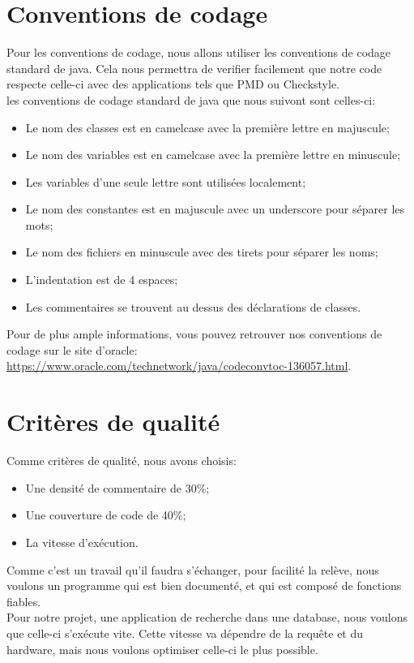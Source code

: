 \documentclass[a4paper,11pt]{article}
\begin{document}
\section{Conventions de codage}
Pour les conventions de codage, nous allons utiliser les conventions de codage standard de java.
Cela nous permettra de verifier facilement que notre code respecte celle-ci avec des applications tels que PMD ou Checkstyle.\\
les conventions de codage standard de java que nous suivont sont celles-ci:
\begin{itemize}
  \item Le nom des classes est en camelcase avec la première lettre en majuscule;
  \item Le nom des variables est en camelcase avec la première lettre en minuscule;
  \item Les variables d'une seule lettre sont utilisées localement;
  \item Le nom des constantes est en majuscule avec un underscore pour séparer les mots;
  \item Le nom des fichiers en minuscule avec des tirets pour séparer les noms;
  \item L'indentation est de 4 espaces;
  \item Les commentaires se trouvent au dessus des déclarations de classes.
\end{itemize}


Pour de plus ample informations, vous pouvez retrouver nos conventions de codage sur le site d'oracle:
\url{https://www.oracle.com/technetwork/java/codeconvtoc-136057.html}.

\section{Critères de qualité}
Comme critères de qualité, nous avons choisis:
\begin{itemize}
  \item Une densité de commentaire de 30\%;
  \item Une couverture de code de 40\%;
  \item La vitesse d'exécution.
\end{itemize}


Comme c'est un travail qu'il faudra s'échanger, pour facilité la relève,
nous voulons un programme qui est bien documenté, et qui est composé de fonctions fiables.\\
Pour notre projet, une application de recherche dans une database, nous voulons que celle-ci s'exécute vite.
Cette vitesse va dépendre de la requête et du hardware, mais nous voulons optimiser celle-ci le plus possible.
\end{document}
